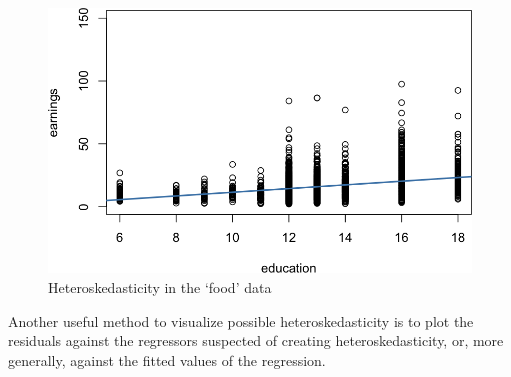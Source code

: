 \documentclass[]{book}
\newenvironment{Shaded}{\begin{snugshade}}{\end{snugshade}}
\newcommand{\DataTypeTok}[1]{\textcolor[rgb]{0.13,0.29,0.53}{#1}}
\newcommand{\KeywordTok}[1]{\textcolor[rgb]{0.13,0.29,0.53}{\textbf{#1}}}
\newcommand{\NormalTok}[1]{#1}
\newcommand{\OperatorTok}[1]{\textcolor[rgb]{0.81,0.36,0.00}{\textbf{#1}}}
\newcommand{\StringTok}[1]{\textcolor[rgb]{0.31,0.60,0.02}{#1}}
\begin{document}
\begin{Shaded}
\end{Shaded}

\begin{figure}

{\centering \includegraphics[width=0.8\linewidth]{MEM5220_R_files/figure-latex/fig18-1} 

}

\caption{Heteroskedasticity in the ‘food’ data}\label{fig:fig18}
\end{figure}

Another useful method to visualize possible heteroskedasticity is to
plot the residuals against the regressors suspected of creating
heteroskedasticity, or, more generally, against the fitted values of the
regression.

\begin{Shaded}
\end{Shaded}
\end{document}
